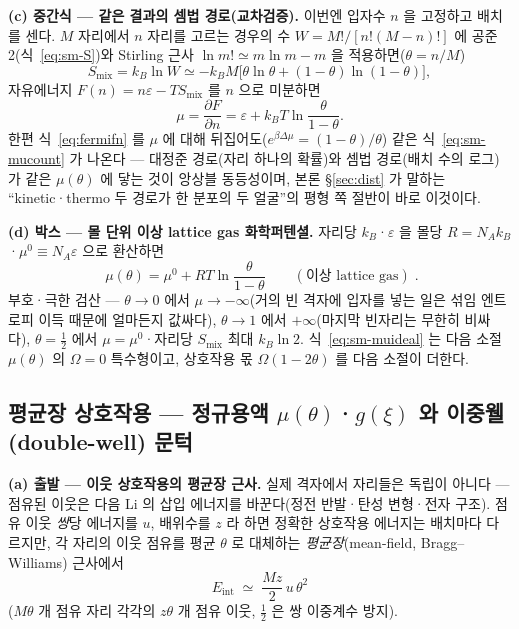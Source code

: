 \documentclass[11pt,a4paper]{article}
\begin{document}
\textbf{(c) 중간식 --- 같은 결과의 셈법 경로(교차검증).} 이번엔 입자수 $n$ 을 고정하고 배치를 센다.
$M$ 자리에서 $n$ 자리를 고르는 경우의 수 $W=M!/[n!(M-n)!]$ 에 공준 2(식~\eqref{eq:sm-S})와 Stirling 근사
$\ln m!\simeq m\ln m-m$ 을 적용하면($\theta=n/M$)
\begin{equation}
S_\mathrm{mix}=k_B\ln W\simeq-k_BM\big[\theta\ln\theta+(1-\theta)\ln(1-\theta)\big],
\label{eq:sm-Smix}
\end{equation}
자유에너지 $F(n)=n\varepsilon-TS_\mathrm{mix}$ 를 $n$ 으로 미분하면
\begin{equation}
\mu=\frac{\partial F}{\partial n}
=\varepsilon+k_BT\ln\frac{\theta}{1-\theta}.
\label{eq:sm-mucount}
\end{equation}
한편 식~\eqref{eq:fermifn} 를 $\mu$ 에 대해 뒤집어도($e^{\beta\Delta\mu}=(1-\theta)/\theta$) 같은
식~\eqref{eq:sm-mucount} 가 나온다 --- 대정준 경로(자리 하나의 확률)와 셈법 경로(배치 수의 로그)가 같은
$\mu(\theta)$ 에 닿는 것이 앙상블 동등성이며, 본론 \S\ref{sec:dist} 가 말하는 ``kinetic·thermo 두 경로가 한
분포의 두 얼굴''의 평형 쪽 절반이 바로 이것이다.

\textbf{(d) 박스 --- 몰 단위 이상 lattice gas 화학퍼텐셜.} 자리당 $k_B$·$\varepsilon$ 을 몰당
$R=N_Ak_B$·$\mu^0\equiv N_A\varepsilon$ 으로 환산하면
\begin{equation}
\boxed{\;\mu(\theta)=\mu^0+RT\ln\frac{\theta}{1-\theta}\qquad(\text{이상 lattice gas})\;.}
\label{eq:sm-muideal}
\end{equation}
부호·극한 검산 --- $\theta\to0$ 에서 $\mu\to-\infty$(거의 빈 격자에 입자를 넣는 일은 섞임 엔트로피 이득 때문에
얼마든지 값싸다), $\theta\to1$ 에서 $+\infty$(마지막 빈자리는 무한히 비싸다), $\theta=\tfrac12$ 에서
$\mu=\mu^0$·자리당 $S_\mathrm{mix}$ 최대 $k_B\ln2$. 식~\eqref{eq:sm-muideal} 는 다음 소절 $\mu(\theta)$ 의
$\Omega=0$ 특수형이고, 상호작용 몫 $\Omega(1-2\theta)$ 를 다음 소절이 더한다.
\subsection{평균장 상호작용 --- 정규용액 $\mu(\theta)$·$g(\xi)$ 와 이중웰(double-well) 문턱}\label{sec:sm-mf}
\textbf{(a) 출발 --- 이웃 상호작용의 평균장 근사.} 실제 격자에서 자리들은 독립이 아니다 --- 점유된 이웃은 다음
Li 의 삽입 에너지를 바꾼다(정전 반발·탄성 변형·전자 구조). 점유 이웃 \emph{쌍}당 에너지를 $u$, 배위수를 $z$
라 하면 정확한 상호작용 에너지는 배치마다 다르지만, 각 자리의 이웃 점유를 평균 $\theta$ 로 대체하는
\emph{평균장}(mean-field, Bragg--Williams) 근사에서
\begin{equation}
E_\mathrm{int}\;\simeq\;\frac{Mz}{2}\,u\,\theta^2
\label{eq:sm-mf}
\end{equation}
($M\theta$ 개 점유 자리 각각의 $z\theta$ 개 점유 이웃, $\tfrac12$ 은 쌍 이중계수 방지).
\end{document}
